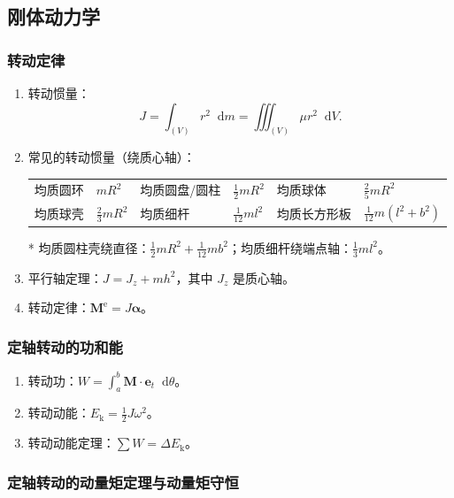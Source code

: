 \documentclass[UTF8,fontset=fandol,zihao=5]{ctexart}
\newcommand{\vect}[1]{\bm{#1}}
\newcommand{\dif}{\mathop{}\!\mathrm{d}}
\begin{document}
\subsection{刚体动力学}

\subsubsection{转动定律}

\begin{enumerate}
  \item 转动惯量：
  \[
    J=\int_{(V)}r^2\dif m=\iiint_{(V)}\mu r^2\dif V.
  \]

  \item 常见的转动惯量（绕质心轴）：

  \begin{center}
  \small
  \setlength{\tabcolsep}{4pt}
  \begin{tabularx}{0.98\linewidth}{X X X X X X}
  \toprule
  均质圆环 & \(mR^2\) & 均质圆盘/圆柱 & \(\frac12mR^2\) & 均质球体 & \(\frac25mR^2\)\\
  均质球壳 & \(\frac23mR^2\) & 均质细杆 & \(\frac1{12}ml^2\) & 均质长方形板 & \(\frac1{12}m(l^2+b^2)\)\\
  \bottomrule
  \end{tabularx}
  \end{center}

  * 均质圆柱壳绕直径：\(\displaystyle\frac12mR^2+\frac1{12}mb^2\)；均质细杆绕端点轴：\(\displaystyle\frac13ml^2\)。

  \item 平行轴定理：\(J=J_z+mh^2\)，其中 \(J_z\) 是质心轴。
  \item 转动定律：\(\vect M^{\mathrm e}=J\vect\alpha\)。
\end{enumerate}

\subsubsection{定轴转动的功和能}

\begin{enumerate}
  \item 转动功：\(\displaystyle W=\int_a^b\vect M\cdot\vect e_t\dif\theta\)。
  \item 转动动能：\(\displaystyle E_{\mathrm k}=\frac12J\omega^2\)。
  \item 转动动能定理：\(\sum W=\Delta E_{\mathrm k}\)。
\end{enumerate}

\subsubsection{定轴转动的动量矩定理与动量矩守恒}
\end{document}
